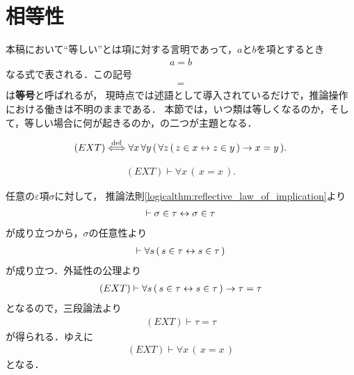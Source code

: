 \section{相等性}
	本稿において``等しい''とは項に対する言明であって，$a$と$b$を項とするとき
	\begin{align}
		a = b
	\end{align}
	なる式で表される．この記号
	\begin{align}
		=
	\end{align}
	は{\bf 等号}と呼ばれるが，
	現時点では述語として導入されているだけで，推論操作における働きは不明のままである．
	本節では，いつ類は等しくなるのか，そして，等しい場合に何が起きるのか，の二つが主題となる．
	
	\begin{screen}
		\begin{axm}
			\begin{align}
				(EXT) \overset{\mathrm{def}}{\Longleftrightarrow} \forall x\, \forall y\, (\, \forall z\, 
				(\, z \in x \leftrightarrow z \in y\, )
				\rightarrow x=y\, ).
			\end{align}
		\end{axm}
	\end{screen}
	
	\begin{screen}
		\begin{thm}[任意の集合は自分自身と等しい]
			\label{thm:any_class_equals_to_itself}
			\begin{align}
				(EXT) \vdash \forall x\, (\, x = x\, ).
			\end{align}
		\end{thm}
	\end{screen}
	
	\begin{sketch}
		任意の$\varepsilon$項$\sigma$に対して，
		推論法則\ref{logicalthm:reflective_law_of_implication}より
		\begin{align}
			\vdash \sigma \in \tau \leftrightarrow \sigma \in \tau
		\end{align}
		が成り立つから，$\sigma$の任意性より
		\begin{align}
			\vdash \forall s\, (\, s \in \tau  \leftrightarrow s \in \tau\, )
		\end{align}
		が成り立つ．外延性の公理より
		\begin{align}
			(EXT) \vdash \forall s\, (\, s \in \tau  \leftrightarrow s \in \tau\, )
			\rightarrow \tau = \tau
		\end{align}
		となるので，三段論法より
		\begin{align}
			(EXT) \vdash \tau = \tau
		\end{align}
		が得られる．ゆえに
		\begin{align}
			(EXT) \vdash \forall x\, (\, x = x\, )
		\end{align}
		となる．
		\QED
	\end{sketch}
	
